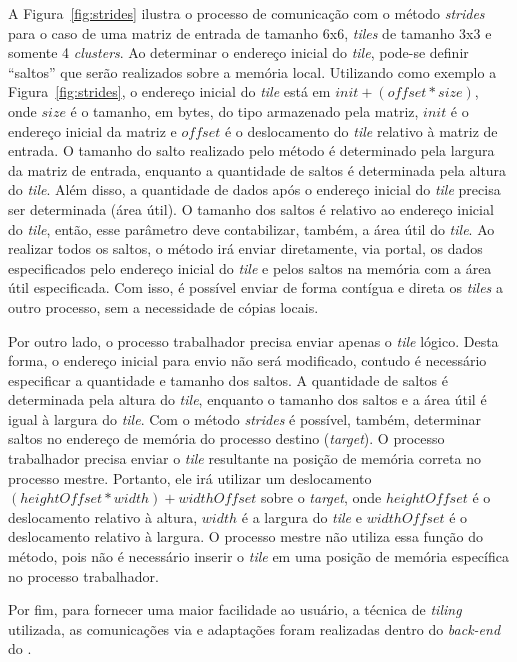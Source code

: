 
A Figura~\ref{fig:strides} ilustra o processo de comunicação com o método
\textit{strides} para o caso de uma matriz de entrada de tamanho 6x6, \textit{tiles} de tamanho 3x3
e somente 4 \textit{clusters}. Ao determinar o endereço inicial do
\textit{tile}, pode-se definir ``saltos'' que serão realizados sobre a
memória local. Utilizando como exemplo a Figura~\ref{fig:strides}, o endereço inicial
do \textit{tile} está em $init+(offset * size)$, onde $size$ é o tamanho, em bytes,
do tipo armazenado pela matriz, $init$ é o endereço inicial da matriz e $offset$
é o deslocamento do \textit{tile} relativo à matriz de entrada. O tamanho
do salto realizado pelo método é determinado pela largura da matriz de
entrada, enquanto a quantidade de saltos é determinada pela altura do
\textit{tile}. Além disso, a quantidade de dados após o endereço inicial do
\textit{tile} precisa ser determinada (área útil). O tamanho dos saltos é
relativo ao endereço inicial do \textit{tile}, então, esse parâmetro deve
contabilizar, também, a área útil do \textit{tile}. Ao realizar todos os
saltos, o método irá enviar diretamente, via portal, os dados especificados
pelo endereço inicial do \textit{tile} e pelos saltos na memória com a área útil
especificada. Com isso, é possível enviar de forma contígua e direta os
\textit{tiles} a outro processo, sem a necessidade de cópias locais.

Por outro lado, o processo trabalhador precisa enviar apenas o \textit{tile}
lógico. Desta forma, o endereço inicial para envio não será modificado, contudo
é necessário especificar a quantidade e tamanho dos saltos. A quantidade de
saltos é determinada pela altura do \textit{tile}, enquanto o tamanho dos
saltos e a área útil é igual à largura do \textit{tile}. Com o método
\textit{strides} é possível, também, determinar saltos no endereço de
memória do processo destino (\textit{target}). O processo trabalhador precisa
enviar o \textit{tile} resultante na posição de memória correta no processo
mestre.  Portanto, ele irá utilizar um deslocamento $(heightOffset * width) +
widthOffset$ sobre o \textit{target}, onde $heightOffset$ é o deslocamento
relativo à altura, $width$ é a largura do \textit{tile} e $widthOffset$ é o
deslocamento relativo à largura. O processo mestre não utiliza essa função do
método, pois não é necessário inserir o \textit{tile} em uma posição de memória
específica no processo trabalhador.

Por fim, para fornecer uma maior facilidade ao usuário, a técnica de
\textit{tiling} utilizada, as comunicações via \noc e adaptações foram
realizadas dentro do \textit{back-end} do \pskel.
